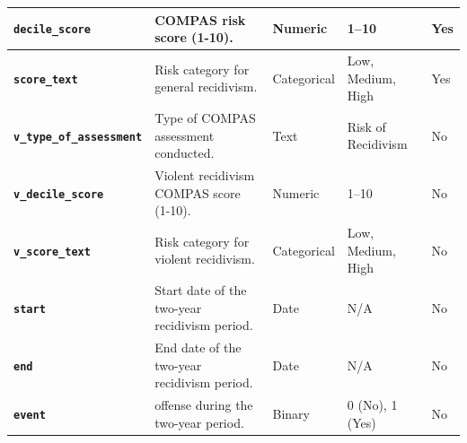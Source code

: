 \documentclass[conference]{IEEEtran}
\begin{document}
\begin{table}[!ht]
\begin{tabular}{|l|l|l|l|l|}
		\textbf{\texttt{decile\_score}}	&	COMPAS risk score (1-10).	&	Numeric	&	1–10	&	Yes \\ \hline
		\textbf{\texttt{score\_text}}	&	Risk category for general recidivism.	&	Categorical	&	Low, Medium, High	&	Yes \\ \hline
		\textbf{\texttt{v\_type\_of\_assessment}}	&	Type of COMPAS assessment conducted.	&	Text	&	Risk of Recidivism	&	No \\ \hline
		\textbf{\texttt{v\_decile\_score}}	&	Violent recidivism COMPAS score (1-10).	&	Numeric	&	1–10	&	No \\ \hline
		\textbf{\texttt{v\_score\_text}}	&	Risk category for violent recidivism.	&	Categorical	&	Low, Medium, High	&	No \\ \hline
		\textbf{\texttt{start}}	&	Start date of the two-year recidivism period.	&	Date	&	N/A	&	No \\ \hline
		\textbf{\texttt{end}}	&	End date of the two-year recidivism period.	&	Date	&	N/A	&	No \\ \hline
		\textbf{\texttt{event}}	&	offense during the two-year period.	&	Binary	&	0 (No), 1 (Yes)	&	No \\ \hline
	\end{tabular}
\end{table}
\end{document}
